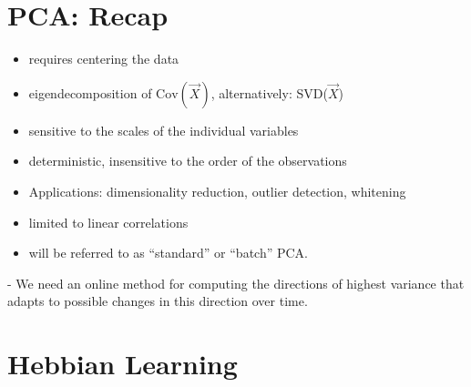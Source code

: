 
\section{PCA: Recap}

\begin{frame}{\secname}

\begin{itemize}
\item requires centering the data
\item eigendecomposition of $\text{Cov}(\vec X)$, alternatively: SVD($\vec X$)
\item sensitive to the scales of the individual variables
\item deterministic, insensitive to the order of the observations
\item Applications: dimensionality reduction, outlier detection, whitening
\item limited to linear correlations
\item will be referred to as ``standard'' or ``batch'' PCA.
\end{itemize}

\pause


\pause

- We need an online method for computing the directions of highest variance that adapts to possible changes in this direction over time.

\end{frame}

\section{Hebbian Learning}



